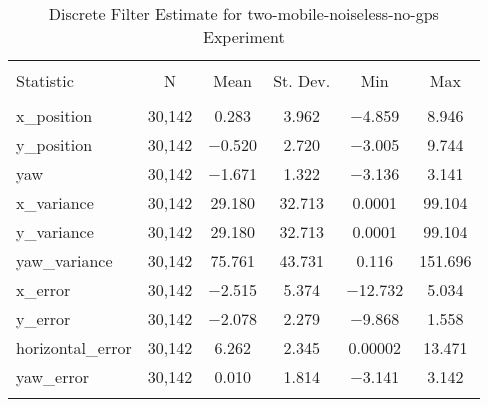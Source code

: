 
\begin{table}[h] \centering 
  \caption{Discrete Filter Estimate for two-mobile-noiseless-no-gps Experiment} 
  \label{tab:two_mobile_noiseless_no_gps_discrete_summary} 
\begin{tabular}{@{\extracolsep{5pt}}lccccc} 
\\[-1.8ex]\hline 
\hline \\[-1.8ex] 
Statistic & \multicolumn{1}{c}{N} & \multicolumn{1}{c}{Mean} & \multicolumn{1}{c}{St. Dev.} & \multicolumn{1}{c}{Min} & \multicolumn{1}{c}{Max} \\ 
\hline \\[-1.8ex] 
x\_position & 30,142 & \num{0.283} & \num{3.962} & $-$4.859 & \num{8.946} \\ 
y\_position & 30,142 & $-$0.520 & \num{2.720} & $-$3.005 & \num{9.744} \\ 
yaw & 30,142 & $-$1.671 & \num{1.322} & $-$3.136 & \num{3.141} \\ 
x\_variance & 30,142 & \num{29.180} & \num{32.713} & \num{0.0001} & \num{99.104} \\ 
y\_variance & 30,142 & \num{29.180} & \num{32.713} & \num{0.0001} & \num{99.104} \\ 
yaw\_variance & 30,142 & \num{75.761} & \num{43.731} & \num{0.116} & \num{151.696} \\ 
x\_error & 30,142 & $-$2.515 & \num{5.374} & $-$12.732 & \num{5.034} \\ 
y\_error & 30,142 & $-$2.078 & \num{2.279} & $-$9.868 & \num{1.558} \\ 
horizontal\_error & 30,142 & \num{6.262} & \num{2.345} & \num{0.00002} & \num{13.471} \\ 
yaw\_error & 30,142 & \num{0.010} & \num{1.814} & $-$3.141 & \num{3.142} \\ 
\hline \\[-1.8ex] 
\end{tabular} 
\end{table} 
